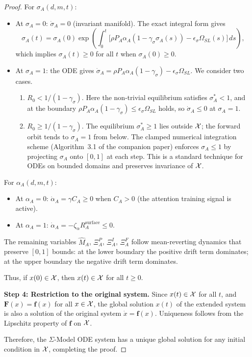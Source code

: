 \begin{proof}
For $\sigma_A(d,m,t)$:
\begin{itemize}
\item At $\sigma_A = 0$: $\dot{\sigma}_A = 0$ (invariant manifold).
  The exact integral form gives
  \[
  \sigma_A(t) = \sigma_A(0) \exp\!\left(
  \int_0^t \bigl[ \rho P_A \alpha_A (1 - \gamma_\sigma \sigma_A(s))
  - \epsilon_\sigma \Omega_{SL}(s) \bigr]\, ds \right),
  \]
  which implies $\sigma_A(t) \geq 0$ for all $t$ when $\sigma_A(0) \geq 0$.
\item At $\sigma_A = 1$: the ODE gives
  $\dot{\sigma}_A = \rho P_A \alpha_A (1 - \gamma_\sigma) - \epsilon_\sigma \Omega_{SL}$.
  We consider two cases.
  \begin{enumerate}
  \item[\textbf{Case 1:}] $R_0 < 1/(1 - \gamma_\sigma)$. Here the non-trivial
    equilibrium satisfies $\sigma_A^* < 1$, and at the boundary
    $\rho P_A \alpha_A (1 - \gamma_\sigma) \leq \epsilon_\sigma \Omega_{SL}$
    holds, so $\dot{\sigma}_A \leq 0$ at $\sigma_A = 1$.
  \item[\textbf{Case 2:}] $R_0 \geq 1/(1 - \gamma_\sigma)$. The equilibrium
    $\sigma_A^* \geq 1$ lies outside $\mathcal{X}$; the forward orbit tends to $\sigma_A = 1$
    from below. The clamped numerical integration scheme (Algorithm~3.1 of the
    companion paper) enforces $\sigma_A \leq 1$ by projecting $\sigma_A$
    onto $[0,1]$ at each step. This is a standard technique for ODEs on
    bounded domains and preserves invariance of $\mathcal{X}$.
  \end{enumerate}
\end{itemize}

For $\alpha_A(d,m,t)$:
\begin{itemize}
\item At $\alpha_A = 0$: $\dot{\alpha}_A = \gamma C_A \geq 0$ when
  $C_A > 0$ (the attention training signal is active).
\item At $\alpha_A = 1$: $\dot{\alpha}_A = -\zeta_\alpha R_A^{\mathrm{surface}} \leq 0$.
\end{itemize}

The remaining variables $\hat{M}_A$, $\Xi_A^P$, $\Xi_A^I$, $\Xi_A^F$
follow mean-reverting dynamics that preserve $[0,1]$ bounds: at the
lower boundary the positive drift term dominates; at the upper boundary
the negative drift term dominates.

Thus, if $x(0) \in \mathcal{X}$, then $x(t) \in \mathcal{X}$ for all $t \geq 0$.

\textbf{Step 4: Restriction to the original system.}
Since $x(t) \in \mathcal{X}$ for all $t$, and $\mathbf{F}(x) = \mathbf{f}(x)$ for
all $x \in \mathcal{X}$, the global solution $x(t)$ of the extended system is also
a solution of the original system $\dot{x} = \mathbf{f}(x)$. Uniqueness
follows from the Lipschitz property of $\mathbf{f}$ on $\mathcal{X}$.

Therefore, the $\Sigma$-Model ODE system has a unique global solution for
any initial condition in $\mathcal{X}$, completing the proof.
\end{proof}

